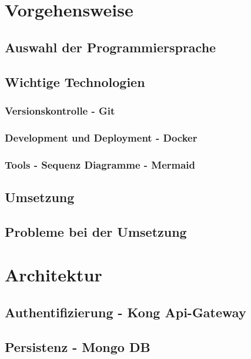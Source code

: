 \documentclass[12pt]{article}
\begin{document}
\newpage

\section{Vorgehensweise}
\subsection{Auswahl der Programmiersprache}
\subsection{Wichtige Technologien}
\subsubsection{Versionskontrolle - Git}
\subsubsection{Development und Deployment - Docker}
\subsubsection{Tools - Sequenz Diagramme - Mermaid}


\subsection{Umsetzung}
\subsection{Probleme bei der Umsetzung}

\newpage

\section{Architektur}
\subsection{Authentifizierung - Kong Api-Gateway}
\subsection{Persistenz - Mongo DB}
\end{document}
